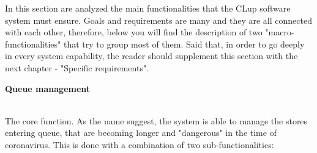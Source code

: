 \documentclass[]{article}
\begin{document}
In this section are analyzed the main functionalities that the CLup software system must ensure. Goals and requirements are many and they are all connected with each other, therefore, below you will find the description of two "macro-functionalities" that try to group most of them. Said that, in order to go deeply in every system capability, the reader should supplement this section with the next chapter - "Specific requirements".
\bigskip
\\
\begin{large}
	\textbf{Queue management}
\end{large}
\smallskip
\\
The core function. As the name suggest, the system is able to manage the stores entering queue, that are becoming longer and "dangerous" in the time of coronavirus. This is done with a combination of two sub-functionalities: 
\end{document}
